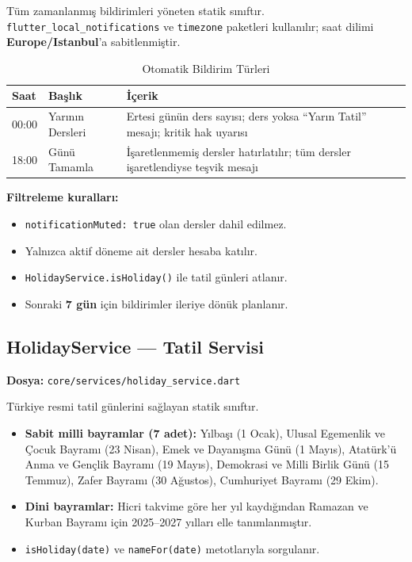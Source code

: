 \documentclass[12pt,a4paper]{article}
\begin{document}
Tüm zamanlanmış bildirimleri yöneten statik sınıftır. \texttt{flutter\_local\_notifications} ve \texttt{timezone} paketleri kullanılır; saat dilimi \textbf{Europe/Istanbul}'a sabitlenmiştir.

\begin{table}[H]
    \centering
    \caption{Otomatik Bildirim Türleri}
    \label{tab:notif}
    \renewcommand{\arraystretch}{1.3}
    \begin{tabularx}{\textwidth}{l l X}
        \toprule
        \textbf{Saat} & \textbf{Başlık} & \textbf{İçerik} \\
        \midrule
        00:00 & Yarının Dersleri & Ertesi günün ders sayısı; ders yoksa ``Yarın Tatil'' mesajı; kritik hak uyarısı \\
        18:00 & Günü Tamamla & İşaretlenmemiş dersler hatırlatılır; tüm dersler işaretlendiyse teşvik mesajı \\
        \bottomrule
    \end{tabularx}
\end{table}

\textbf{Filtreleme kuralları:}
\begin{itemize}
    \item \texttt{notificationMuted: true} olan dersler dahil edilmez.
    \item Yalnızca aktif döneme ait dersler hesaba katılır.
    \item \texttt{HolidayService.isHoliday()} ile tatil günleri atlanır.
    \item Sonraki \textbf{7 gün} için bildirimler ileriye dönük planlanır.
\end{itemize}

\subsection{HolidayService — Tatil Servisi}
\textbf{Dosya:} \texttt{core/services/holiday\_service.dart}

Türkiye resmi tatil günlerini sağlayan statik sınıftır.

\begin{itemize}
    \item \textbf{Sabit milli bayramlar (7 adet):} Yılbaşı (1 Ocak), Ulusal Egemenlik ve Çocuk Bayramı (23 Nisan), Emek ve Dayanışma Günü (1 Mayıs), Atatürk'ü Anma ve Gençlik Bayramı (19 Mayıs), Demokrasi ve Milli Birlik Günü (15 Temmuz), Zafer Bayramı (30 Ağustos), Cumhuriyet Bayramı (29 Ekim).
    \item \textbf{Dini bayramlar:} Hicri takvime göre her yıl kaydığından Ramazan ve Kurban Bayramı için 2025--2027 yılları elle tanımlanmıştır.
    \item \texttt{isHoliday(date)} ve \texttt{nameFor(date)} metotlarıyla sorgulanır.
\end{itemize}
\end{document}
